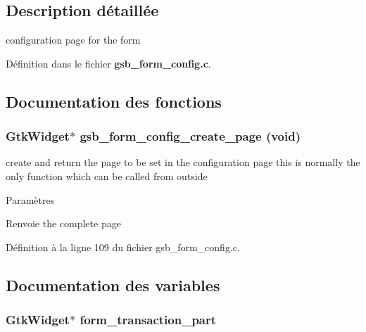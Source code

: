 \subsection{Description détaillée}
configuration page for the form 

Définition dans le fichier {\bf gsb\_\-form\_\-config.c}.



\subsection{Documentation des fonctions}
\subsubsection[{gsb\_\-form\_\-config\_\-create\_\-page}]{\setlength{\rightskip}{0pt plus 5cm}GtkWidget$\ast$ gsb\_\-form\_\-config\_\-create\_\-page (void)}\label{gsb__form__config_8c_a18d33ebc2a3da624ca405227c6db0a4f}
create and return the page to be set in the configuration page this is normally the only function which can be called from outside


\begin{DoxyParams}{Paramètres}
\item[{\em }]\end{DoxyParams}
\begin{DoxyReturn}{Renvoie}
the complete page 
\end{DoxyReturn}


Définition à la ligne 109 du fichier gsb\_\-form\_\-config.c.



\subsection{Documentation des variables}
\subsubsection[{form\_\-transaction\_\-part}]{\setlength{\rightskip}{0pt plus 5cm}GtkWidget$\ast$ {\bf form\_\-transaction\_\-part}}\label{gsb__form__config_8c_afb5de72ed97c05cc117b44cf61adfb86}



